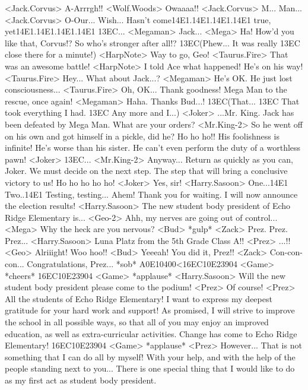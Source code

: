 <Jack.Corvus> A-Arrrgh!! 
<Wolf.Woods> Owaaaa!! 
<Jack.Corvus> M... 
Man... 
<Jack.Corvus> O-Our... Wish... Hasn't come{14}{E1}.{14}{E1}.{14}{E1}.{14}{E1} true, yet{14}{E1}.{14}{E1}.{14}{E1}.{14}{E1} 
{13}{EC}... 
<Megaman> Jack... 
<Mega> Ha! How'd you like that, Corvus!? 
So who's stronger after all!? 
{13}{EC}(Phew... It was really {13}{EC} close there for a minute!) 
<HarpNote> Way to go, Geo! 
<Taurus.Fire> That was an awesome battle! 
<HarpNote> I told Ace what happened! 
He's on his way! 
<Taurus.Fire> Hey... What about Jack...? 
<Megaman> He's OK. He just lost consciousness... 
<Taurus.Fire> Oh, OK... Thank goodness! 
Mega Man to the rescue, once again! 
<Megaman> Haha. Thanks Bud...! 
{13}{EC}(That... {13}{EC} That took everything I had. {13}{EC} Any more and I...) 
<Joker> ...Mr. King. 
Jack has been defeated by Mega Man. 
What are your orders? 
<Mr.King-2> So he went off on his own and got himself in a pickle, did he? 
Ho ho ho!! His foolishness is infinite! 
He's worse than his sister. He can't even perform the duty of a worthless pawn! 
<Joker> {13}{EC}... 
<Mr.King-2> Anyway... Return as quickly as you can, Joker. 
We must decide on the next step. 
The step that will bring a conclusive victory to us! 
Ho ho ho ho ho! 
<Joker> Yes, sir! 
<Harry.Sasoon> One...{14}{E1} Two..{14}{E1} Testing, testing... 
Ahem! 
Thank you for waiting. 
I will now announce the election results! 
<Harry.Sasoon> The new student body president of Echo Ridge Elementary is... 
<Geo-2> Ahh, my nerves are going out of control... 
<Mega> Why the heck are you nervous? 
<Bud> *gulp* 
<Zack> Prez. Prez. Prez... 
<Harry.Sasoon> Luna Platz from the 5th Grade Class A!! 
<Prez> ...!! 
<Geo> Alriiight! 
Woo hoo!! 
<Bud> Yeeeah! You did it, Prez!! 
<Zack> Con-con-con... 
Congratulations, Prez... 
*sob* 
{A0}{E1}{04}{00}<{16}{EC}{10}{E2}{39}{04} 
<Game> *cheers* 
{16}{EC}{10}{E2}{39}{04} 
<Game> *applause* 
<Harry.Sasoon> Will the new student body president please come to the podium! 
<Prez> Of course! 
<Prez> All the students of Echo Ridge Elementary! 
I want to express my deepest gratitude for your hard work and support! 
As promised, I will strive to improve the school in all possible ways, so 
that all of you may enjoy an improved education, as 
well as extra-curricular activities. 
Change has come to Echo Ridge Elementary! 
{16}{EC}{10}{E2}{39}{04} 
<Game> *applause* 
<Prez> However... 
That is not something that I can do all by myself! 
With your help, and with the help of the people standing next to you... 
There is one special thing that I would like to do as 
my first act as student body president. 
